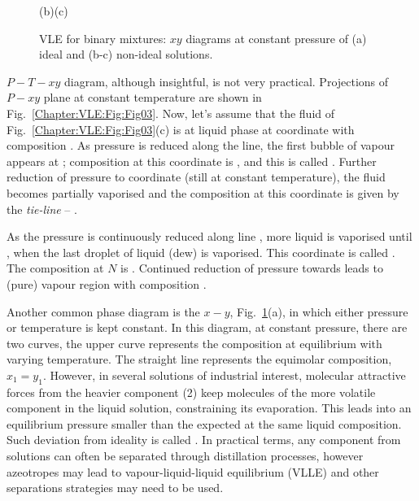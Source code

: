 \begin{figure}[h]
{          \vspace{-.5cm}
          \hbox{\hspace{3.5cm}(b)\hspace{7.5cm}(c)}}
          \vspace{-.1cm}\caption{VLE for binary mixtures: $xy$ diagrams at constant pressure of (a) ideal and (b-c) non-ideal solutions.}\label{Chapter:VLE:Fig:Fig04}
      \end{figure}

$P-T-xy$ diagram, although insightful, is not very practical. Projections of $P-xy$ plane at constant temperature are shown in Fig.~\ref{Chapter:VLE:Fig:Fig03}. Now, let's assume that the fluid of Fig.~\ref{Chapter:VLE:Fig:Fig03}(c) is at liquid phase at coordinate  with composition . As pressure is reduced along the  line, the first bubble of vapour appears at ; composition at this coordinate is , and this is called . Further reduction of pressure to coordinate  (still at constant temperature), the fluid becomes partially vaporised and the composition at this coordinate is given by the {\it tie-line}  -- . 

As the pressure is continuously reduced along line , more liquid is vaporised until , when the last droplet of liquid (dew) is vaporised. This coordinate is called . The composition at $N$ is . Continued reduction of pressure towards  leads to (pure) vapour region with composition .

     Another common phase diagram is the $x-y$, Fig.~\ref{Chapter:VLE:Fig:Fig04}(a), in which either pressure or temperature is kept constant. In this diagram, at constant pressure, there are two curves, the upper curve represents the composition at equilibrium with varying temperature. The straight line represents the equimolar composition, \ie $x_{1}=y_{1}$. However, in several solutions of industrial interest, molecular attractive forces from the heavier component (2) keep molecules of the more volatile component in the liquid solution, constraining its evaporation. This leads into an equilibrium pressure smaller than the expected at the same liquid composition. Such deviation from ideality is called . In practical terms, any component from solutions can often be separated through distillation processes, however azeotropes may lead to vapour-liquid-liquid equilibrium (VLLE) and other separations strategies may need to be used.
     
